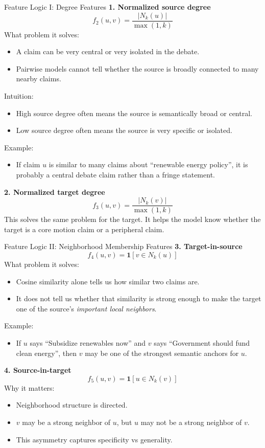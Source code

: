 \documentclass[aspectratio=169]{beamer}
\begin{document}
\begin{frame}[shrink=8]{Feature Logic I: Degree Features}
\small
\textbf{1. Normalized source degree}
\[
f_2(u,v)=\frac{|N_k(u)|}{\max(1,k)}
\]
What problem it solves:
\begin{itemize}
  \item A claim can be very central or very isolated in the debate.
  \item Pairwise models cannot tell whether the source is broadly connected to many nearby claims.
\end{itemize}

Intuition:
\begin{itemize}
  \item High source degree often means the source is semantically broad or central.
  \item Low source degree often means the source is very specific or isolated.
\end{itemize}

Example:
\begin{itemize}
  \item If claim \(u\) is similar to many claims about ``renewable energy policy'', it is probably a central debate claim rather than a fringe statement.
\end{itemize}

\textbf{2. Normalized target degree}
\[
f_3(u,v)=\frac{|N_k(v)|}{\max(1,k)}
\]
This solves the same problem for the target. It helps the model know whether the target is a core motion claim or a peripheral claim.
\normalsize
\end{frame}

\begin{frame}[shrink=8]{Feature Logic II: Neighborhood Membership Features}
\small
\textbf{3. Target-in-source}
\[
f_4(u,v)=\mathbf{1}[v \in N_k(u)]
\]
What problem it solves:
\begin{itemize}
  \item Cosine similarity alone tells us how similar two claims are.
  \item It does not tell us whether that similarity is strong enough to make the target one of the source's \emph{important local neighbors}.
\end{itemize}

Example:
\begin{itemize}
  \item If \(u\) says ``Subsidize renewables now'' and \(v\) says ``Government should fund clean energy'', then \(v\) may be one of the strongest semantic anchors for \(u\).
\end{itemize}

\textbf{4. Source-in-target}
\[
f_5(u,v)=\mathbf{1}[u \in N_k(v)]
\]
Why it matters:
\begin{itemize}
  \item Neighborhood structure is directed.
  \item \(v\) may be a strong neighbor of \(u\), but \(u\) may not be a strong neighbor of \(v\).
  \item This asymmetry captures specificity vs generality.
\end{itemize}
\normalsize
\end{frame}
\end{document}
